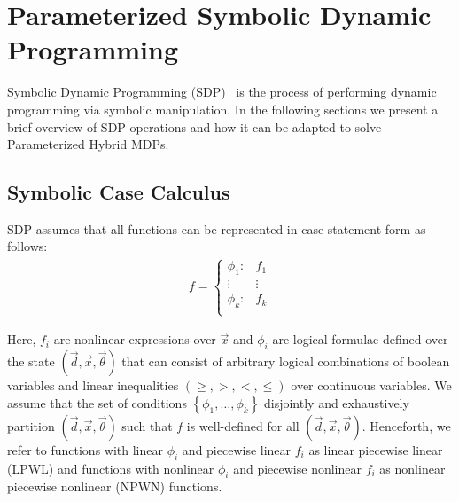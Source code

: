 \section{Parameterized Symbolic Dynamic Programming}
\label{sec:sdp}

Symbolic Dynamic Programming (SDP)~\cite{Boutilier_IJCAI_2001} is the process of performing dynamic programming via symbolic manipulation. In the following sections we present a brief overview of SDP operations and how it can be adapted to solve Parameterized Hybrid MDPs.

\subsection{Symbolic Case Calculus}

SDP assumes that all functions can be represented in case statement form \cite{Boutilier_IJCAI_2001} as follows:
{\footnotesize 
    \abovedisplayskip=5pt
    \belowdisplayskip=0pt
    \begin{align*}
        f = 
        \begin{cases}
            \phi_1: & f_1 \\ 
            \vdots & \vdots\\ 
            \phi_k: & f_k \\ 
        \end{cases}
    \end{align*}
}%

Here, {\footnotesize$ f_i $} are nonlinear expressions over {\footnotesize$ \vec{x} $} and {\footnotesize$\phi_i$} are logical formulae defined over the state {\footnotesize$( \vec{d}, \vec{x}, \vec{\theta})$} that can consist of arbitrary logical combinations of boolean variables and linear inequalities {\footnotesize$\left( \geq, >, <, \leq \right)$} over continuous variables. We assume that the set of conditions {\footnotesize$\left\lbrace \phi_1, \ldots, \phi_k \right\rbrace$} disjointly and exhaustively partition {\footnotesize$(\vec{d}, \vec{x}, \vec{\theta})$} such that {\footnotesize$f$} is well-defined for all {\footnotesize$(\vec{d}, \vec{x}, \vec{\theta})$}. Henceforth, we refer to functions with linear {\footnotesize$\phi_i$} and piecewise linear {\footnotesize$f_i$} as linear piecewise linear (LPWL) and functions with nonlinear {\footnotesize$\phi_i$} and piecewise nonlinear {\footnotesize$f_i$} as nonlinear piecewise nonlinear (NPWN) functions.

